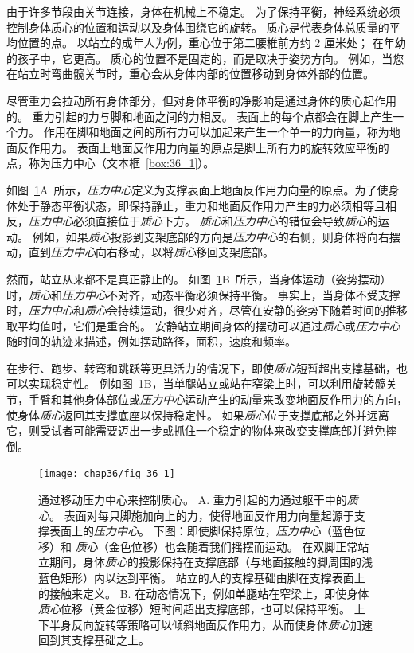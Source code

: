 由于许多节段由关节连接，身体在机械上不稳定。
为了保持平衡，神经系统必须控制身体质心的位置和运动以及身体围绕它的旋转。
质心是代表身体总质量的平均位置的点。
以站立的成年人为例，重心位于第二腰椎前方约 2 厘米处；
在年幼的孩子中，它更高。
质心的位置不是固定的，而是取决于姿势方向。
例如，当您在站立时弯曲髋关节时，重心会从身体内部的位置移动到身体外部的位置。


尽管重力会拉动所有身体部分，但对身体平衡的净影响是通过身体的质心起作用的。
重力引起的力与脚和地面之间的力相反。
表面上的每个点都会在脚上产生一个力。
作用在脚和地面之间的所有力可以加起来产生一个单一的力向量，称为地面反作用力。
表面上地面反作用力向量的原点是脚上所有力的旋转效应平衡的点，称为压力中心（文本框~\ref{box:36_1}）。



\begin{proposition}[神经解剖学导航术语] \label{box:36_1}
	
	\quad \quad 如图~\ref{fig:36_1}A~所示，\textit{压力中心}定义为支撑表面上地面反作用力向量的原点。为了使身体处于静态平衡状态，即保持静止，重力和地面反作用力产生的力必须相等且相反，\textit{压力中心}必须直接位于\textit{质心}下方。
	\textit{质心}和\textit{压力中心}的错位会导致\textit{质心}的运动。
	例如，如果\textit{质心}投影到支架底部的方向是\textit{压力中心}的右侧，则身体将向右摆动，直到\textit{压力中心}向右移动，以将\textit{质心}移回支架底部。
	
	\quad \quad 然而，站立从来都不是真正静止的。
	如图~\ref{fig:36_1}B~所示，当身体运动（姿势摆动）时，\textit{质心}和\textit{压力中心}不对齐，动态平衡必须保持平衡。
	事实上，当身体不受支撑时，\textit{压力中心}和\textit{质心}会持续运动，很少对齐，尽管在安静的姿势下随着时间的推移取平均值时，它们是重合的。
	安静站立期间身体的摆动可以通过\textit{质心}或\textit{压力中心}随时间的轨迹来描述，例如摆动路径，面积，速度和频率。
	
	\quad \quad 在步行、跑步、转弯和跳跃等更具活力的情况下，即使\textit{质心}短暂超出支撑基础，也可以实现稳定性。
	例如图~\ref{fig:36_1}B，当单腿站立或站在窄梁上时，可以利用旋转髋关节，手臂和其他身体部位或\textit{压力中心}运动产生的动量来改变地面反作用力的方向，使身体\textit{质心}返回其支撑底座以保持稳定性。
	如果\textit{质心}位于支撑底部之外并远离它，则受试者可能需要迈出一步或抓住一个稳定的物体来改变支撑底部并避免摔倒。
	
\end{proposition}


\begin{figure}[htbp]
	\centering
	\texttt{[image: chap36/fig\_36\_1]}
	\caption{通过移动压力中心来控制质心。
		A. 重力引起的力通过躯干中的\textit{质心}。 
		表面对每只脚施加向上的力，使得地面反作用力向量起源于支撑表面上的\textit{压力中心}。 
		下图：即使脚保持原位，\textit{压力中心}（蓝色位移）和 \textit{质心}（金色位移）也会随着我们摇摆而运动。
		在双脚正常站立期间，身体\textit{质心}的投影保持在支撑底部（与地面接触的脚周围的浅蓝色矩形）内以达到平衡。
		站立的人的支撑基础由脚在支撑表面上的接触来定义。
		B. 在动态情况下，例如单腿站在窄梁上，即使身体\textit{质心}位移（黄金位移）短时间超出支撑底部，也可以保持平衡。
		上下半身反向旋转等策略可以倾斜地面反作用力，从而使身体\textit{质心}加速回到其支撑基础之上\cite{otten1999balancing}。}
	\label{fig:36_1}
\end{figure}


